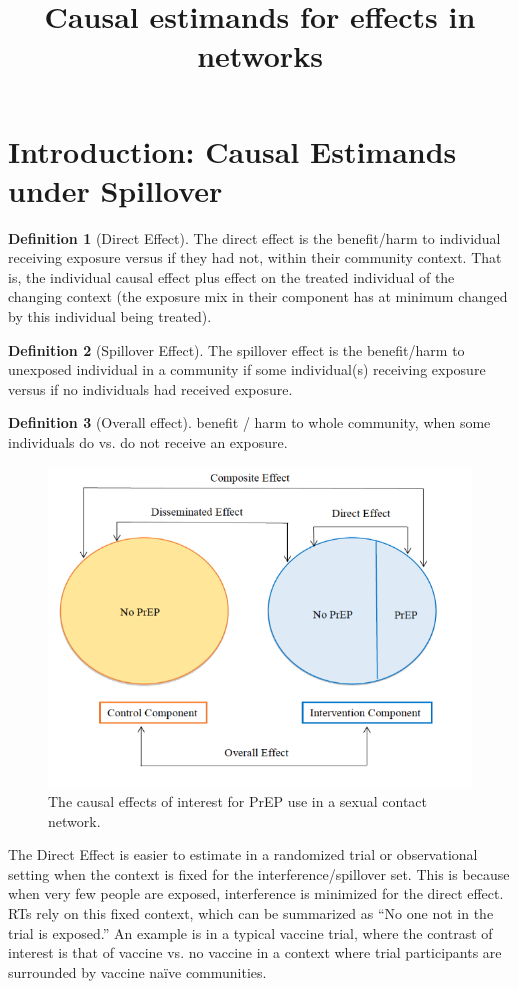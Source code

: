 \documentclass{article}
\title{Causal estimands for effects in networks}
\author{}
\date{}
\theoremstyle{definition}
\newtheorem{definition}{Definition}[section]
\begin{document}
\maketitle

\section{Introduction: Causal Estimands under Spillover}
\begin{definition}[Direct Effect]The direct effect is the benefit/harm to individual receiving exposure versus if they had not, within their community context. That is, the individual causal effect plus effect on the treated individual of the changing context (the exposure mix in their component has at minimum changed by this individual being treated).
\end{definition}
\begin{definition}[Spillover Effect] The spillover effect is the benefit/harm to unexposed individual in a community if some individual(s) receiving exposure versus if no individuals had received exposure.
\end{definition}
\begin{definition}[Overall effect]benefit / harm to whole community, when some individuals do vs. do not receive an exposure.
\end{definition}

\begin{figure}[H]
    \centering
    \includegraphics{Figures/figure1.png}
    \caption{The causal effects of interest for PrEP use in a sexual contact network.}
    \label{fig:1}
\end{figure}
The Direct Effect is easier to estimate in a randomized trial or observational setting when the context is fixed for the interference/spillover set. This is because when very few people are exposed, interference is minimized for the direct effect. RTs rely on this fixed context, which can be summarized as ``No one not in the trial is exposed.'' An example is in a typical vaccine trial, where the contrast of interest is that of vaccine vs. no vaccine in a context where trial participants are surrounded by vaccine naïve communities.
\end{document}
